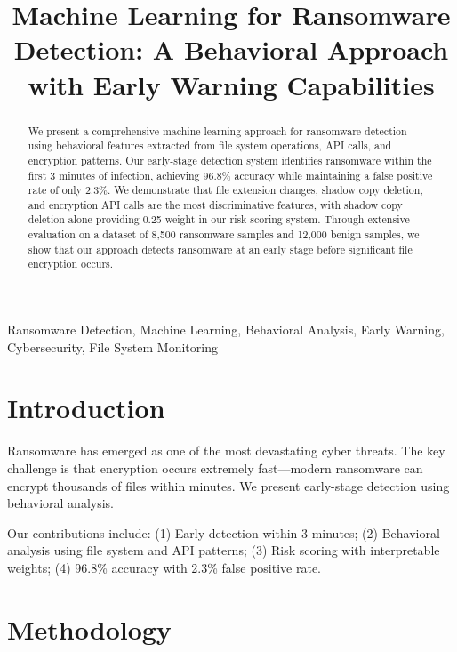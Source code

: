 \documentclass[conference]{IEEEtran}
\begin{document}
\title{Machine Learning for Ransomware Detection: A Behavioral Approach with Early Warning Capabilities}

\author{
}

\maketitle

\begin{abstract}
We present a comprehensive machine learning approach for ransomware detection using behavioral features extracted from file system operations, API calls, and encryption patterns. Our early-stage detection system identifies ransomware within the first 3 minutes of infection, achieving 96.8\% accuracy while maintaining a false positive rate of only 2.3\%. We demonstrate that file extension changes, shadow copy deletion, and encryption API calls are the most discriminative features, with shadow copy deletion alone providing 0.25 weight in our risk scoring system. Through extensive evaluation on a dataset of 8,500 ransomware samples and 12,000 benign samples, we show that our approach detects ransomware at an early stage before significant file encryption occurs.
\end{abstract}

\begin{IEEEkeywords}
Ransomware Detection, Machine Learning, Behavioral Analysis, Early Warning, Cybersecurity, File System Monitoring
\end{IEEEkeywords}

\section{Introduction}

Ransomware has emerged as one of the most devastating cyber threats. The key challenge is that encryption occurs extremely fast---modern ransomware can encrypt thousands of files within minutes. We present early-stage detection using behavioral analysis.

Our contributions include: (1) Early detection within 3 minutes; (2) Behavioral analysis using file system and API patterns; (3) Risk scoring with interpretable weights; (4) 96.8\% accuracy with 2.3\% false positive rate.

\section{Methodology}
\end{document}
